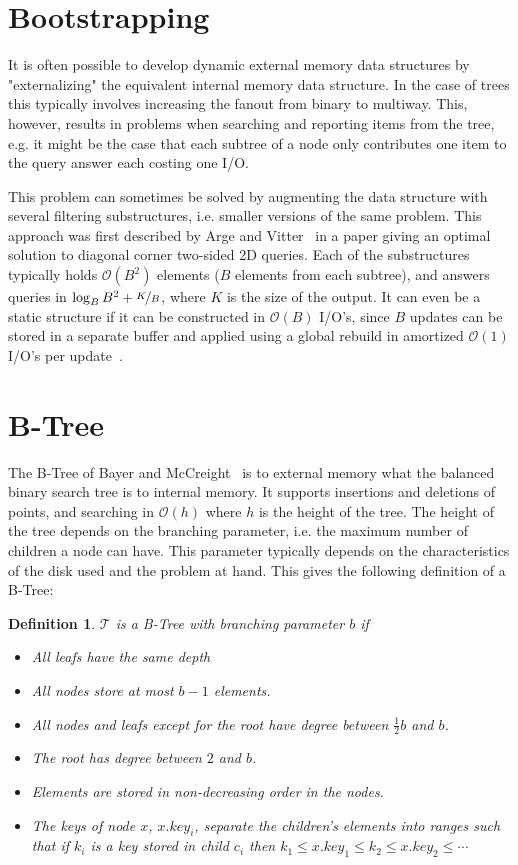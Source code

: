 \documentclass[twoside,11pt,openright]{report}
\newtheorem{definition}{Definition}
\begin{document}
\section{Bootstrapping}
It is often possible to develop dynamic external memory data structures by "externalizing" the equivalent internal memory data structure. In the case of trees this typically involves increasing the fanout from binary to multiway. This, however, results in problems when searching and reporting items from the tree, e.g. it might be the case that each subtree of a node only contributes one item to the query answer each costing one I/O.

This problem can sometimes be solved by augmenting the data structure with several filtering substructures, i.e. smaller versions of the same problem. This approach was first described by Arge and Vitter~\cite{arge_vitter_2003} in a paper giving an optimal solution to diagonal corner two-sided 2D queries. Each of the substructures typically holds $\mathcal{O}(B^2)$ elements ($B$ elements from each subtree), and answers queries in $\log_B B^2 + \nicefrac{K}{B}$, where $K$ is the size of the output. It can even be a static structure if it can be constructed in $\mathcal{O}(B)$ I/O's, since $B$ updates can be stored in a separate buffer and applied using a global rebuild in amortized $\mathcal{O}(1)$ I/O's per update~\cite{vitter_2008}.

\section{B-Tree}
\label{sec:prelim_b_tree}
The B-Tree of Bayer and McCreight~\cite{bayer_mccreight_1972} is to external memory what the balanced binary search tree is to internal memory. It supports insertions and deletions of points, and searching in $\mathcal{O}(h)$ where $h$ is the height of the tree. The height of the tree depends on the branching parameter, i.e. the maximum number of children a node can have. This parameter typically depends on the characteristics of the disk used and the problem at hand. 
This gives the following definition of a B-Tree:

\begin{definition}
\label{def:btree}
$\mathcal{T}$ is a B-Tree with branching parameter $b$ if
\begin{itemize}
	\item All leafs have the same depth
	\item All nodes store at most $b-1$ elements.
	\item All nodes and leafs except for the root have degree between $\frac{1}{2}b$ and $b$.
	\item The root has degree between $2$ and $b$.
	\item Elements are stored in non-decreasing order in the nodes.
	\item The keys of node $x$, $x.key_i$, separate the children's elements into ranges such that if $k_i$ is a key stored in child $c_i$ then $k_1 \leq x.key_1 \leq k_2 \leq x.key_2 \leq \cdots$
\end{itemize}
\end{definition}
\end{document}
